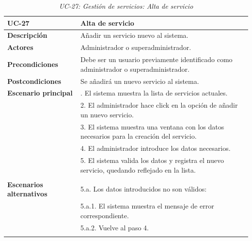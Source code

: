 \begin{table}
  \begin{center}
    \begin{tabularx}{16.4cm}{|l|X|}
      \hline
      \textbf{UC-27} & \textbf{Alta de servicio}\\
      \hline
      \textbf{Descripción} & Añadir un servicio nuevo al sistema.\\
      \hline
      \textbf{Actores} & Administrador o superadministrador.\\
      \hline
      \textbf{Precondiciones} & Debe ser un usuario previamente identificado como administrador o superadministrador.\\
      \hline
      \textbf{Postcondiciones} & Se añadirá un nuevo servicio al sistema.\\
      \hline
      \textbf{Escenario principal} & \smallskip 1. El sistema muestra la lista de servicios actuales.\\
      & 2. El administrador hace click en la opción de añadir un nuevo servicio.\\
      & 3. El sistema muestra una ventana con los datos necesarios para la creación del servicio.\\
      & 4. El administrador introduce los datos necesarios.\\
      & 5. El sistema valida los datos y registra el nuevo servicio, quedando reflejado en la lista.\\
      & \\
      \hline
      \textbf{Escenarios alternativos} & \smallskip 5.a. Los datos introducidos no son válidos:\\
      & \hspace{0.3cm} 5.a.1. El sistema muestra el mensaje de error correspondiente.\\
      & \hspace{0.3cm} 5.a.2. Vuelve al paso 4.\\
      & \\
      \hline
    \end{tabularx}
    \caption{\textit{UC-27: Gestión de servicios: Alta de servicio}}
    \label{tab:CU-alta-servicio}
  \end{center}
\end{table}





